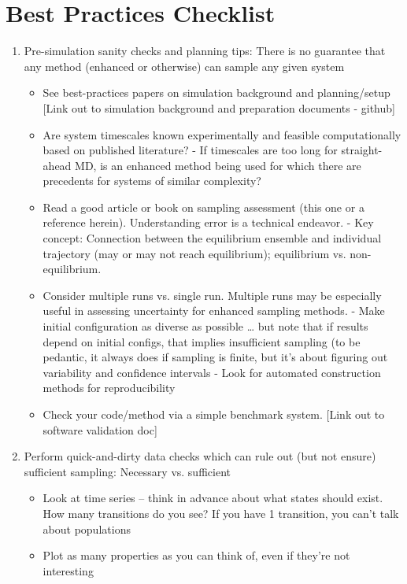 \documentclass[9pt]{livecoms}
\begin{document}
\section{Best Practices Checklist}
\begin{enumerate}
\item
Pre-simulation sanity checks and planning tips: There is no guarantee that any method (enhanced or otherwise) can sample any given system
    \begin{itemize}
    \item See best-practices papers on simulation background and planning/setup [Link out to simulation background and preparation documents - github]
    \item Are system timescales known experimentally and feasible computationally based on published literature?
      - If timescales are too long for straight-ahead MD, is an enhanced method being used for which there are precedents for systems of similar complexity?
    \item Read a good article or book on sampling assessment (this one or a reference herein).  Understanding error is a technical endeavor.
      - Key concept: Connection between the equilibrium ensemble and individual trajectory (may or may not reach equilibrium); equilibrium vs. non-equilibrium.
    \item Consider multiple runs vs. single run.  Multiple runs may be especially useful in assessing uncertainty for enhanced sampling methods.
      - Make initial configuration as diverse as possible  … but note that if results depend on initial configs, that implies insufficient sampling (to be pedantic, it always does if sampling is finite, but it’s about figuring out variability and confidence intervals
      - Look for automated construction methods for reproducibility
    \item Check your code/method via a simple benchmark system.  [Link out to software validation doc]
    \end{itemize}
\item
Perform quick-and-dirty data checks which can rule out (but not ensure) sufficient sampling: Necessary vs. sufficient
    \begin{itemize}
    \item Look at time series -- think in advance about what states should exist. How many transitions do you see? If you have 1 transition, you can’t talk about populations
    \item Plot as many properties as you can think of, even if they’re not interesting

\end{itemize}
\end{enumerate}
\end{document}
